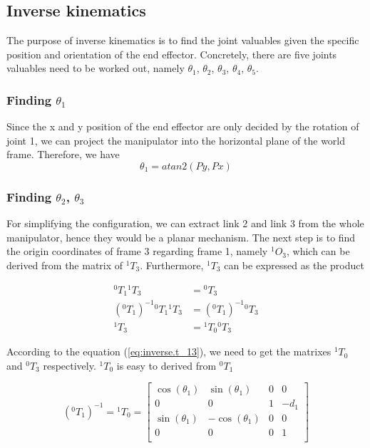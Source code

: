 \documentclass{article}
\renewcommand{\c}[1]{\cos(\theta_{#1})}
\newcommand{\s}[1]{\sin(\theta_{#1})}
\newcommand{\T}[2]{{}^{#1}T_{#2}}
\renewcommand{\O}[2]{{}^{#1}O_{#2}}
\begin{document}
\subsection{Inverse kinematics}
The purpose of inverse kinematics is to find the joint valuables given the specific position and orientation of the end effector. Concretely, there are five joints valuables need to be worked out, namely  $\theta_1$,  $\theta_2$,  $\theta_3$,  $\theta_4$,  $\theta_5$.

\subsubsection{Finding  $\theta_1$}
Since the x and y position of the end effector are only decided by the rotation of joint 1, we can project the manipulator into the horizontal plane of the world frame. Therefore, we have
\begin{equation}
\theta_1 = atan2(Py, Px)
\end{equation}

\subsubsection{Finding  $\theta_2$, $\theta_3$}
For simplifying the configuration, we can extract link 2 and link 3 from the whole manipulator, hence they would be a planar mechanism. The next step is to find the origin coordinates of frame 3 regarding frame 1, namely $\O{1}{3}$, which can be derived from the matrix of $\T{1}{3}$. Furthermore, $\T{1}{3}$ can be expressed as the product

\begin{align}
\label{eq:inverse.t_13}
\T{0}{1}\T{1}{3} & = \T{0}{3} \nonumber \\
{(\T{0}{1})}^{-1}\T{0}{1}\T{1}{3}& = {(\T{0}{1})}^{-1} \T{0}{3} \nonumber \\
\T{1}{3} & = \T{1}{0} \T{0}{3}
\end{align}

According to the equation (\ref{eq:inverse.t_13}), we need to get the matrixes $\T{1}{0}$ and $\T{0}{3}$ respectively. $\T{1}{0}$ is easy to derived from $\T{0}{1}$ 

\begin{equation}
\label{eq:inverse.t_10}
{(\T{0}{1})}^{-1} = \T{1}{0} = \left[
\begin{array}{cccc}
	\c{1} & \s{1} & 0 & 0 \\
	0 & 0 & 1 & -d_1 \\
	\s{1} & -\c{1} & 0 & 0 \\
	0 & 0 & 0 & 1 \\
\end{array}
\right]
\end{equation}
\end{document}
